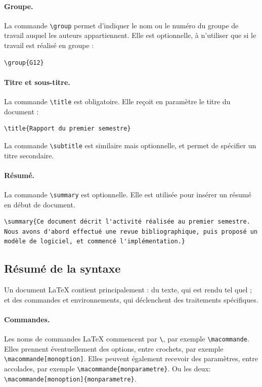 \documentclass{ceri/sty/rapport}
\begin{document}
\paragraph{Groupe.} La commande \texttt{\textbackslash{}group} permet d'indiquer le nom ou le numéro du groupe de travail auquel les auteurs appartiennent. Elle est optionnelle, à n'utiliser que si le travail est réalisé en groupe :
\begin{lstlisting}[language={[LaTeX]TeX}, numbers=none]
\group{G12}
\end{lstlisting}

\paragraph{Titre et sous-titre.} La commande \texttt{\textbackslash{}title} est obligatoire. Elle reçoit en paramètre le titre du document :
\begin{lstlisting}[language={[LaTeX]TeX}, numbers=none]
\title{Rapport du premier semestre}    
\end{lstlisting}
\noindent La commande \texttt{\textbackslash{}subtitle} est similaire mais optionnelle, et permet de spécifier un titre secondaire.

\paragraph{Résumé.} La commande \texttt{\textbackslash{}summary} est optionnelle. Elle est utilisée pour insérer un résumé en début de document.
\begin{lstlisting}[language={[LaTeX]TeX}, numbers=none]
\summary{Ce document décrit l'activité réalisée au premier semestre. Nous avons d'abord effectué une revue bibliographique, puis proposé un modèle de logiciel, et commencé l'implémentation.}
\end{lstlisting}


\subsection{Résumé de la syntaxe}
\label{sec:Syntaxe}
Un document \LaTeX{} contient principalement : du texte, qui est rendu tel quel ; et des commandes et environnements, qui déclenchent des traitements spécifiques. 

\paragraph{Commandes.} Les noms de commandes \LaTeX{} commencent par \texttt{\textbackslash{}}, par exemple \texttt{\textbackslash{}macommande}. Elles prennent éventuellement des options, entre crochets, par exemple \texttt{\textbackslash{}macommande[monoption]}. Elles peuvent également recevoir des paramètres, entre accolades, par exemple \texttt{\textbackslash{}macommande\{monparametre\}}. Ou les deux: \texttt{\textbackslash{}macommande[monoption]\{monparametre\}}.
\end{document}
